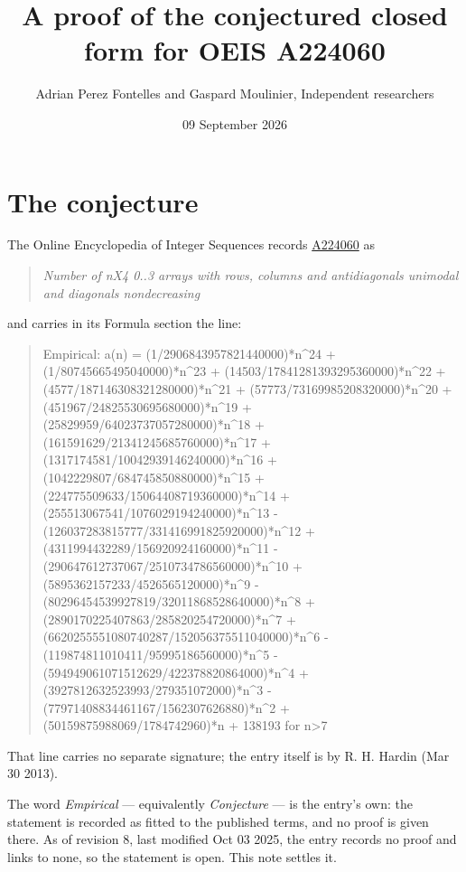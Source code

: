 \documentclass[11pt]{article}
\title{A proof of the conjectured closed form for OEIS A224060}
\author{Adrian Perez Fontelles and Gaspard Moulinier, Independent researchers}
\date{09 September 2026}
\theoremstyle{definition}
\begin{document}
\maketitle
\section{The conjecture}

The Online Encyclopedia of Integer Sequences records \href{https://oeis.org/A224060}{A224060} as

\begin{quote}\itshape Number of nX4 0..3 arrays with rows, columns and antidiagonals unimodal and diagonals nondecreasing\end{quote}

and carries in its Formula section the line:

\begin{quote}\ttfamily Empirical: a(n) = (1/2906843957821440000)*n\textasciicircum{}24 + (1/80745665495040000)*n\textasciicircum{}23 + (14503/17841281393295360000)*n\textasciicircum{}22 + (4577/187146308321280000)*n\textasciicircum{}21 + (57773/73169985208320000)*n\textasciicircum{}20 + (451967/24825530695680000)*n\textasciicircum{}19 + (25829959/64023737057280000)*n\textasciicircum{}18 + (161591629/21341245685760000)*n\textasciicircum{}17 + (1317174581/10042939146240000)*n\textasciicircum{}16 + (1042229807/684745850880000)*n\textasciicircum{}15 + (224775509633/15064408719360000)*n\textasciicircum{}14 + (255513067541/1076029194240000)*n\textasciicircum{}13 - (126037283815777/331416991825920000)*n\textasciicircum{}12 + (4311994432289/156920924160000)*n\textasciicircum{}11 - (290647612737067/2510734786560000)*n\textasciicircum{}10 + (5895362157233/4526565120000)*n\textasciicircum{}9 - (80296454539927819/32011868528640000)*n\textasciicircum{}8 + (2890170225407863/285820254720000)*n\textasciicircum{}7 + (6620255551080740287/152056375511040000)*n\textasciicircum{}6 - (119874811010411/95995186560000)*n\textasciicircum{}5 - (594949061071512629/422378820864000)*n\textasciicircum{}4 + (3927812632523993/279351072000)*n\textasciicircum{}3 - (77971408834461167/1562307626880)*n\textasciicircum{}2 + (50159875988069/1784742960)*n + 138193 for n>7\end{quote}

That line carries no separate signature; the entry itself is by R. H. Hardin (Mar 30 2013).

The word {\itshape Empirical} --- equivalently {\itshape Conjecture} --- is the entry's own: the statement is recorded as fitted to the published terms, and no proof is given there. As of revision 8, last modified Oct 03 2025, the entry records no proof and links to none, so the statement is open. This note settles it.
\end{document}
